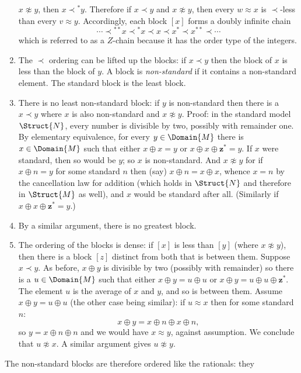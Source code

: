 \documentclass[../../include/open-logic-section]{subfiles}
\begin{document}
\begin{enumerate}
  $x \not\approx y$, then $x \prec {^*y}$. Therefore if $x \prec y$
  and $x \not\approx y$, then every $w \approx x$ is $\prec$-less than
  every $v \approx y$. Accordingly, each block $[x]$ forms a doubly
  infinite chain
  \[
  \cdots \prec  {^{**}x} \prec {^*}x \prec x \prec x^* \prec x^{**}
  \prec \cdots
  \]
  which is referred to as a $Z$-chain because it has the order type of
  the integers.
\item The $\prec$ ordering can be lifted up the blocks: if $x \prec y$
  then the block of $x$ is less than the block of $y$. A block is
  \emph{non-standard} if it contains a non-standard element. The
  standard block is the least block. 
\item There is no least non-standard block: if $y$ is non-standard
  then there is a $x \prec y$ where $x$ is also non-standard and $x
  \not\approx y$. Proof: in the standard model $\Struct{N}$, every
  number is divisible by two, possibly with remainder one. By
  elementary equivalence, for every $y \in \Domain{M}$ there is $x \in
  \Domain{M}$ such that either $x \oplus x = y$ or $x \oplus x \oplus
  \mathbf{z}^*= y$. If $x$ were standard, then so would be $y$; so $x$
  is non-standard. And $x \not\approx y$ for if $x \oplus n = y$ for
  some standard $n$ then (say) $x \oplus n = x \oplus x$, whence $x =
  n$ by the cancellation law for addition (which holds in $\Struct{N}$
  and therefore in $\Struct{M}$ as well), and $x$ would be standard
  after all. (Similarly if $x \oplus x \oplus \mathbf{z}^*= y$.)
\item By a similar argument, there is no greatest block. 
\item The ordering of the blocks is dense: if $[x]$ is less than $[y]$
  (where $x \not\approx y$), then there is a block $[z]$ distinct from
  both that is between them. Suppose $x \prec y$. As before, $x \oplus
  y$ is divisible by two (possibly with remainder) so there is a $u
  \in \Domain{M}$ such that either $x \oplus y = u \oplus u$ or $x
  \oplus y = u \oplus u \oplus \mathbf{z}^*$. The element $u$ is the
  average of $x$ and $y$, and so is between them. Assume $x \oplus y =
  u \oplus u$ (the other case being similar): if $u \approx x$ then
  for some standard $n$:
  \[
  x \oplus y = x \oplus n \oplus x \oplus n,
  \]
  so $y = x \oplus n \oplus n$ and we would have $x \approx y$,
  against assumption. We conclude that $u \not\approx x$. A similar
  argument gives $u \not\approx y$.
\end{enumerate}
The non-standard blocks are therefore ordered like the rationals: they
\end{document}
